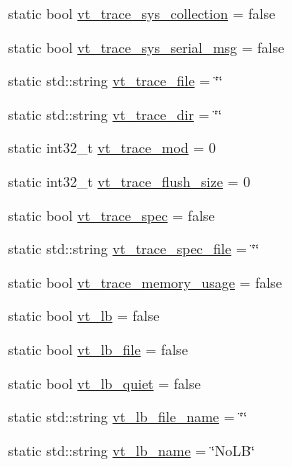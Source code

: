 \begin{DoxyCompactItemize}
static bool \hyperlink{structvt_1_1arguments_1_1_arg_config_ac4afb6f023f686f3ed1643394d3ea80c}{vt\+\_\+trace\+\_\+sys\+\_\+collection} = false
\item 
static bool \hyperlink{structvt_1_1arguments_1_1_arg_config_a44627a2ab6723ed7646511a12124325e}{vt\+\_\+trace\+\_\+sys\+\_\+serial\+\_\+msg} = false
\item 
static std\+::string \hyperlink{structvt_1_1arguments_1_1_arg_config_a296fe4ab5d11f984532b780ffcf74657}{vt\+\_\+trace\+\_\+file} = \char`\"{}\char`\"{}
\item 
static std\+::string \hyperlink{structvt_1_1arguments_1_1_arg_config_aa30e39d83c2391ff918f86f8d5009b3f}{vt\+\_\+trace\+\_\+dir} = \char`\"{}\char`\"{}
\item 
static int32\+\_\+t \hyperlink{structvt_1_1arguments_1_1_arg_config_acb14bb6b6f58db2a35bc71a4c6c06799}{vt\+\_\+trace\+\_\+mod} = 0
\item 
static int32\+\_\+t \hyperlink{structvt_1_1arguments_1_1_arg_config_a8f122ed882f2de1f03091edbe64f1f2b}{vt\+\_\+trace\+\_\+flush\+\_\+size} = 0
\item 
static bool \hyperlink{structvt_1_1arguments_1_1_arg_config_a5985e792d6c3810293b54dda059460bd}{vt\+\_\+trace\+\_\+spec} = false
\item 
static std\+::string \hyperlink{structvt_1_1arguments_1_1_arg_config_a0369ed37706b8e7d563cd8f25763a56c}{vt\+\_\+trace\+\_\+spec\+\_\+file} = \char`\"{}\char`\"{}
\item 
static bool \hyperlink{structvt_1_1arguments_1_1_arg_config_aa4ca0b4d3eedbe726b0c50d178dfb3bf}{vt\+\_\+trace\+\_\+memory\+\_\+usage} = false
\item 
static bool \hyperlink{structvt_1_1arguments_1_1_arg_config_aab51ec67928526875a458f982e5fa90c}{vt\+\_\+lb} = false
\item 
static bool \hyperlink{structvt_1_1arguments_1_1_arg_config_a970d5784bfb69a34a04ec393fcd41cf6}{vt\+\_\+lb\+\_\+file} = false
\item 
static bool \hyperlink{structvt_1_1arguments_1_1_arg_config_ab0a9812811750643510b00fb7c0651a5}{vt\+\_\+lb\+\_\+quiet} = false
\item 
static std\+::string \hyperlink{structvt_1_1arguments_1_1_arg_config_adadeb5ba97bec396d11b5c856736bd3e}{vt\+\_\+lb\+\_\+file\+\_\+name} = \char`\"{}\char`\"{}
\item 
static std\+::string \hyperlink{structvt_1_1arguments_1_1_arg_config_a856cdf90d67403a08574e5a7a3ca792c}{vt\+\_\+lb\+\_\+name} = \char`\"{}No\+LB\char`\"{}
\item 

\end{DoxyCompactItemize}
